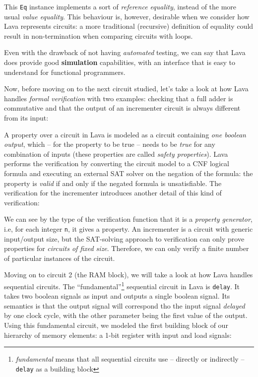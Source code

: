             This \texttt{Eq} instance implements a sort of \emph{reference equality}, instead of the
            more usual \emph{value equality}. This behaviour is, however, desirable when we consider
            how Lava represents circuits: a more traditional (recursive) definition of equality
            could result in non-termination when comparing circuits with loops.

            Even with the drawback of not having \emph{automated} testing, we can say that Lava does
            provide good \textbf{simulation} capabilities, with an interface that is easy to
            understand for functional programmers.

            Now, before moving on to the next circuit studied, let's take a look at how Lava handles
            \emph{formal verification} with two examples: checking that a full adder is commutative
            and that the output of an incrementer circuit is always different from its input:


            A property over a circuit in Lava is modeled as a circuit containing \emph{one boolean
                output}, which -- for the property to be true -- needs to be \emph{true} for any
            combination of inputs (these properties are called \emph{safety properties}). Lava
            performs the verification by converting the circuit model to a CNF logical formula and
            executing an external SAT solver on the negation of the formula: the property is
            \emph{valid} if and only if the negated formula is unsatisfiable. The verification for
            the incrementer introduces another detail of this kind of verification:


            We can see by the type of the verification function that it is a \emph{property
                generator}, i.e, for each integer \texttt{n}, it gives a property. An incrementer is
            a circuit with generic input/output size, but the SAT-solving approach to verification
            can only prove properties for \emph{circuits of fixed size}. Therefore, we can only
            verify a finite number of particular instances of the circuit.

            Moving on to circuit 2 (the RAM block), we will take a look at how Lava handles
            sequential circuits. The ``fundamental''\footnote{\emph{fundamental} means that all
                sequential circuits use -- directly or indirectly -- \texttt{delay} as a building
                block} sequential circuit in Lava is \texttt{delay}.  It takes two boolean signals
            as input and outputs a single boolean signal. Its semantics is that the output signal
            will correspond tho the input signal \emph{delayed} by one clock cycle, with the other
            parameter being the first value of the output.  Using this fundamental circuit, we
            modeled the first building block of our hierarchy of memory elements: a 1-bit register
            with input and load signals:

